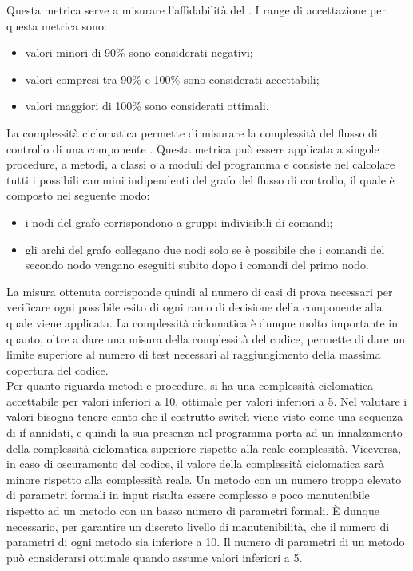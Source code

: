 					Questa metrica serve a misurare l'affidabilità del .
					I range di accettazione per questa metrica sono:
					\begin{itemize}
					\item valori minori di 90\% sono considerati negativi;
					\item valori compresi tra 90\% e 100\% sono considerati accettabili;
					\item valori maggiori di 100\% sono considerati ottimali.
					\end{itemize}
				La complessità ciclomatica permette di misurare la complessità del flusso di controllo di una componente . Questa metrica può essere applicata a singole procedure, a metodi, a classi o a moduli del programma e consiste nel calcolare tutti i possibili cammini indipendenti del grafo del flusso di controllo, il quale è composto nel seguente modo:
				\begin{itemize}
					\item i nodi del grafo corrispondono a gruppi indivisibili di comandi;
					\item gli archi del grafo collegano due nodi solo se è possibile che i comandi del secondo nodo vengano eseguiti subito dopo i comandi del primo nodo.
				\end{itemize}
				La misura ottenuta corrisponde quindi al numero di casi di prova necessari per verificare ogni possibile esito di ogni ramo di decisione della componente alla quale viene applicata. La complessità ciclomatica è dunque molto importante in quanto, oltre a dare una misura della complessità del codice, permette di dare un limite superiore al numero di test necessari al raggiungimento della massima copertura del codice.\\
Per quanto riguarda metodi e procedure, si ha una complessità ciclomatica accettabile per valori inferiori a 10, ottimale per valori inferiori a 5. Nel valutare i valori bisogna tenere conto che il costrutto switch viene visto come una sequenza di if annidati, e quindi la sua presenza nel programma porta ad un innalzamento della complessità ciclomatica superiore rispetto alla reale complessità. Viceversa, in caso di oscuramento del codice, il valore della complessità ciclomatica sarà minore rispetto alla complessità reale.
			Un metodo con un numero troppo elevato di parametri formali in input risulta essere complesso e poco manutenibile rispetto ad un metodo con un basso numero di parametri formali. È dunque necessario, per garantire un discreto livello di manutenibilità, che il numero di parametri di ogni metodo sia inferiore a 10. Il numero di parametri di un metodo può considerarsi ottimale quando assume valori inferiori a 5.
